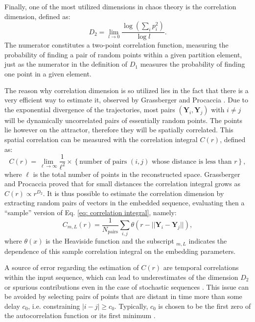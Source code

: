 Finally, one of the most utilized dimensions in chaos theory is the correlation dimension, defined as:
\begin{equation}
    \label{eq: D_2}
    D_2=\lim_{l\rightarrow0}\frac{\log(\sum_i p_i^2)}{\log l}.
\end{equation}
The numerator constitutes a two-point correlation function, measuring the probability of finding a
pair of random points within a given partition element, just as the numerator in the definition of
$D_1$ measures the probability of finding one point in a given element.

The reason why correlation dimension is so utilized lies in the fact that there is a very
efficient way to estimate it, observed by Grassberger and Procaccia \cite{ref:grassberger1983measuring}.
Due to the exponential divergence of the trajectories, most pairs
$(\mathbf{Y}_i,\mathbf{Y}_j)$ with $i\neq j$ will be dynamically uncorrelated
pairs of essentially random points. The points lie however on the attractor, therefore they will be
spatially correlated. This spatial correlation can be measured with the correlation integral
$C(r)$, defined as:
\begin{equation}
    \label{eq: correlation integral}
    C(r) = \lim_{\ell\rightarrow\infty} \frac{1}{\ell^2}\times\left\{
        \text{number of pairs $(i,j)$ whose distance is less than $r$}
    \right\},
\end{equation}
where $\ell$ is the total number of points in the reconstructed space.
Grassberger and Procaccia proved that for small distances the correlation integral grows as
$C(r)\propto r^{D_2}$. It is thus possible to estimate the correlation dimension
by extracting random pairs of vectors in the embedded sequence, evaluating then a ``sample''
version of Eq. \ref{eq: correlation integral}, namely:
\begin{equation}
    \label{eq: sample correlation integral}
    C_{m,L}(r)=\frac{1}{N_{\text{pairs}}}\sum_{i,j}\theta\left(
        r-||\mathbf{Y}_i-\mathbf{Y}_j||
    \right),
\end{equation}
where $\theta(x)$ is the Heaviside function and the subscript $_{m,L}$ indicates the dependence of this
sample correlation integral on the embedding parameters. 

A source of error regarding the estimation of $C(r)$ are temporal correlations within the input sequence,
which can lead to underestimates of the dimension $D_2$ \cite{ref:theiler1986spurious}
or spurious contributions even in the case of stochastic sequences \cite{ref:osborne1989finite}.
This issue can be avoided by selecting pairs of points that are distant in time more than some delay
$c_0$, i.e. constraining $|i-j|\geq c_0$. Typically, $c_0$ is chosen to be the first zero of the
autocorrelation function \cite{ref:theiler1986spurious} or its first minimum \cite{ref:albano1995kolmogorov}.



